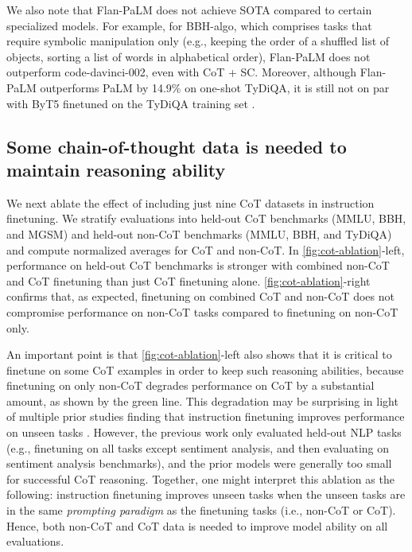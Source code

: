 We also note that Flan-PaLM does not achieve SOTA compared to certain specialized models. For example, for BBH-algo, which comprises tasks that require symbolic manipulation only (e.g., keeping the order of a shuffled list of objects, sorting a list of words in alphabetical order), Flan-PaLM does not outperform code-davinci-002, even with CoT + SC. Moreover, although Flan-PaLM outperforms PaLM by 14.9\% on one-shot TyDiQA, it is still not on par with ByT5 finetuned on the TyDiQA training set \citep{xue-etal-2022-byt5}.

\subsection{Some chain-of-thought data is needed to maintain reasoning ability}

We next ablate the effect of including just nine CoT datasets in instruction finetuning. We stratify evaluations into held-out CoT benchmarks (MMLU, BBH, and MGSM) and held-out non-CoT benchmarks (MMLU, BBH, and TyDiQA) and compute normalized averages for CoT and non-CoT. In \ref{fig:cot-ablation}-left, performance on held-out CoT benchmarks is stronger with combined non-CoT and CoT finetuning than just CoT finetuning alone.
\ref{fig:cot-ablation}-right confirms that, as expected, finetuning on combined CoT and non-CoT does not compromise performance on non-CoT tasks compared to finetuning on non-CoT only.

An important point is that \ref{fig:cot-ablation}-left also shows that it is critical to finetune on some CoT examples in order to keep such reasoning abilities, because finetuning on only non-CoT degrades performance on CoT by a substantial amount, as shown by the green line. This degradation may be surprising in light of multiple prior studies finding that instruction finetuning improves performance on unseen tasks \citep[][\textit{inter alia}]{wei2021finetuned,sanh2021multitask,wang2019superglue,min-etal-2022-metaicl}. However, the previous work only evaluated held-out NLP tasks (e.g., finetuning on all tasks except sentiment analysis, and then evaluating on sentiment analysis benchmarks), and the prior models were generally too small for successful CoT reasoning. Together, one might interpret this ablation as the following: instruction finetuning improves unseen tasks when the unseen tasks are in the same \textit{prompting paradigm} as the finetuning tasks (i.e., non-CoT or CoT). Hence, both non-CoT and CoT data is needed to improve model ability on all evaluations.


